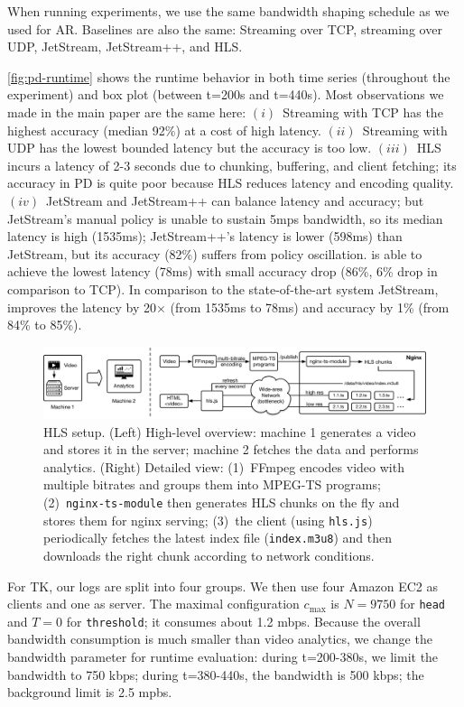 \documentclass[twocolumn, 9pt]{article}
\begin{document}
When running experiments, we use the same bandwidth shaping schedule as we used
for AR. Baselines are also the same: Streaming over TCP, streaming over UDP,
JetStream, JetStream++, and HLS.

\autoref{fig:pd-runtime} shows the runtime behavior in both time series
(throughout the experiment) and box plot (between t=200s and t=440s).  Most
observations we made in the main paper are the same here: $(i)$~Streaming with
TCP has the highest accuracy (median 92\%) at a cost of high
latency. $(ii)$~Streaming with UDP has the lowest bounded latency but the
accuracy is too low. $(iii)$~HLS incurs a latency of 2-3 seconds due to
chunking, buffering, and client fetching; its accuracy in PD is quite poor
because HLS reduces latency and encoding quality. $(iv)$~JetStream and
JetStream++ can balance latency and accuracy; but JetStream's manual policy is
unable to sustain 5mps bandwidth, so its median latency is high (1535ms);
JetStream++'s latency is lower (598ms) than JetStream, but its accuracy (82\%)
suffers from policy oscillation. \sysname{} is able to achieve the lowest
latency (78ms) with small accuracy drop (86\%, 6\% drop in comparison to
TCP). In comparison to the state-of-the-art system JetStream, \sysname{}
improves the latency by 20$\times$ (from 1535ms to 78ms) and accuracy by 1\%
(from 84\% to 85\%).

\begin{figure}[!htb]
  \centering
  \includegraphics[width=\textwidth]{figures/hls-arch.pdf}
  \caption{HLS setup. (Left) High-level overview: machine 1 generates a video
    and stores it in the server; machine 2 fetches the data and performs
    analytics. (Right) Detailed view: (1)~FFmpeg encodes video with multiple
    bitrates and groups them into MPEG-TS programs; (2)~\texttt{nginx-ts-module}
    then generates HLS chunks on the fly and stores them for nginx serving;
    (3)~the client (using \texttt{hls.js}) periodically fetches the latest index
    file (\texttt{index.m3u8}) and then downloads the right chunk according to
    network conditions.}
  \label{fig:hls-arch}
\end{figure}

 For TK, our logs are split into four groups. We then use four
Amazon EC2 as clients and one as server. The maximal configuration $c_{\max}$ is
$N=9750$ for \texttt{head} and $T=0$ for \texttt{threshold}; it consumes about
1.2 mbps. Because the overall bandwidth consumption is much smaller than video
analytics, we change the bandwidth parameter for runtime evaluation: during
t=200-380s, we limit the bandwidth to 750 kbps; during t=380-440s, the bandwidth
is 500 kbps; the background limit is 2.5 mpbs.
\end{document}
